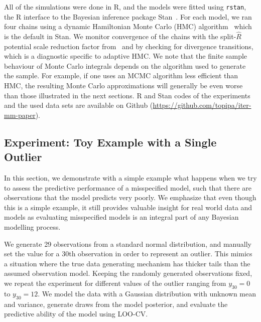 \documentclass[12pt]{article}
\begin{document}
All of the simulations were done in R, and
the models were fitted using \texttt{rstan}, 
the R interface to the Bayesian inference package Stan~\citep{rstan}.
For each model, we ran four chains using a dynamic Hamiltonian Monte Carlo (HMC)
algorithm~\citep{hoffman2014no,Betancourt2017} which is the default in Stan.
%
%
%
We monitor convergence of the chains with the split-$\widehat{R}$ potential scale reduction factor from~\citet{Vehtari+etal:2019:Rhat} and by checking for divergence transitions, which is a diagnostic
specific to adaptive HMC.
%
%
%
%
We note that the finite sample behaviour of Monte Carlo integrals
depends on the algorithm used to generate the sample.
For example, if one uses an MCMC algorithm less efficient than HMC, the
resulting Monte Carlo approximations will generally be even worse than those illustrated in the next sections.
R and Stan codes of the experiments and the used data sets are available on Github (\url{https://github.com/topipa/iter-mm-paper}).






\subsection{Experiment: Toy Example with a Single Outlier} \label{sec:toyexperim}

In this section, we demonstrate with a simple example what happens when
we try to assess the predictive performance of a misspecified model, such that 
there are observations that the model predicts very poorly.
We emphasize that even though this is a simple example, it still provides valuable
insight for real world data and models as
evaluating misspecified models is an integral part of any Bayesian modelling process.





We generate 29 observations from a standard normal distribution, and manually
set the value for a 30th observation in order to represent an outlier.
This mimics a situation where the true data generating mechanism has thicker tails
than the assumed observation model.
Keeping the randomly generated observations fixed, we repeat the experiment
for different values of the outlier ranging from $y_{30} = 0$ to $y_{30} = 12$.
We
model the data with a Gaussian distribution with unknown mean and variance, generate
draws from the model posterior, and evaluate the predictive ability of the model using
LOO-CV.
\end{document}
